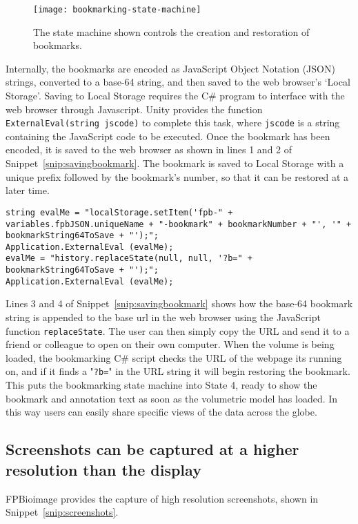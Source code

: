 \begin{figure}[htbp!]
\centering
\texttt{[image: bookmarking-state-machine]}
\caption[FPBioimage: Bookmark creation and restoration is controlled by a state machine]{The state machine shown controls the creation and restoration of bookmarks. }
\label{fig:bookmarking-state-machine}
\end{figure}

Internally, the bookmarks are encoded as JavaScript Object Notation (JSON) strings, converted to a base-64 string, and then saved to the web browser's `Local Storage'.
Saving to Local Storage requires the C\# program to interface with the web browser through Javascript.
Unity provides the function \texttt{ExternalEval(string jscode)} to complete this task, where \texttt{jscode} is a string containing the JavaScript code to be executed.
Once the bookmark has been encoded, it is saved to the web browser as shown in lines 1 and 2 of Snippet~\ref{snip:savingbookmark}.
The bookmark is saved to Local Storage with a unique prefix followed by the bookmark's number, so that it can be restored at a later time.

\begin{lstlisting}[language={[Sharp]c}, label={snip:savingbookmark}, caption={C\#-JavaScript interface code for interacting with the browser's local storage to save and share bookmarks.}]
string evalMe = "localStorage.setItem('fpb-" + variables.fpbJSON.uniqueName + "-bookmark" + bookmarkNumber + "', '" + bookmarkString64ToSave + "');";
Application.ExternalEval (evalMe);
evalMe = "history.replaceState(null, null, '?b=" + bookmarkString64ToSave + "');";
Application.ExternalEval (evalMe);
\end{lstlisting}

Lines 3 and 4 of Snippet~\ref{snip:savingbookmark} shows how the base-64 bookmark string is appended to the base url in the web browser using the JavaScript function \texttt{replaceState}.
The user can then simply copy the URL and send it to a friend or colleague to open on their own computer.
When the volume is being loaded, the bookmarking C\# script checks the URL of the webpage its running on, and if it finds a "\texttt{?b=}" in the URL string it will begin restoring the bookmark.
This puts the bookmarking state machine into State 4, ready to show the bookmark and annotation text as soon as the volumetric model has loaded.
In this way users can easily share specific views of the data across the globe.

\subsection{Screenshots can be captured at a higher resolution than the display}
FPBioimage provides the capture of high resolution screenshots, shown in Snippet~\ref{snip:screenshots}.


